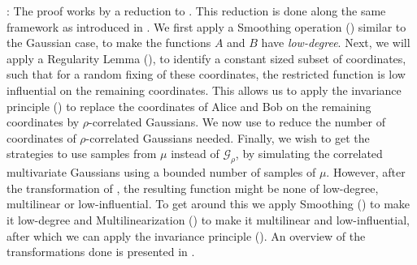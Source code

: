\documentclass[11pt]{article}
\newcommand{\calG}{\mathcal{G}}
\begin{document}
: The proof works by a reduction to . This reduction is done along the same framework as introduced in \cite{GKS_NIS_decidable}. We first apply a Smoothing operation () similar to the Gaussian case, to make the functions $A$ and $B$ have {\em low-degree}. Next, we will apply a Regularity Lemma (), to identify a constant sized subset of coordinates, such that for a random fixing of these coordinates, the restricted function is low influential on the remaining coordinates. This allows us to apply the invariance principle () to replace the coordinates of Alice and Bob on the remaining coordinates by $\rho$-correlated Gaussians. We now use  to reduce the number of coordinates of $\rho$-correlated Gaussians needed. Finally, we wish to get the strategies to use samples from $\mu$ instead of $\calG_{\rho}$, by simulating the correlated multivariate Gaussians using a bounded number of samples of $\mu$. However, after the transformation of , the resulting function might be none of low-degree, multilinear or low-influential. To get around this we apply Smoothing () to make it low-degree and Multilinearization () to make it multilinear and low-influential, after which we can apply the invariance principle (). An overview of the transformations done is presented in .\\
\end{document}
